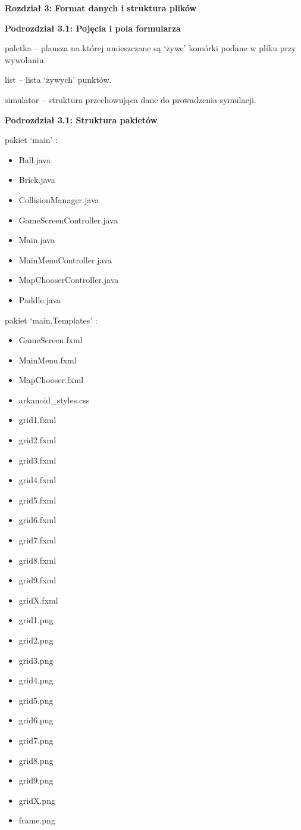 \documentclass[a4paper]{article}
\begin{document}
\bigskip
\textbf{Rozdzia{\l} 3: Format danych i struktura plików}

\bigskip
\textbf{Podrozdzia{\l} 3.1: Pojęcia i pola formularza}

paletka -- plansza na której umieszczane są `\.zywe' komórki podane w pliku przy wywo{\l}aniu.

list -- lista `\.zywych' punktów.

simulator -- struktura przechowująca dane do prowadzenia symulacji.

\bigskip
\textbf{Podrozdzia{\l} 3.1: Struktura pakietów}

\bigskip
pakiet ‘main’ :
\begin{itemize}
\item Ball.java
\item Brick.java
\item CollisionManager.java
\item GameScreenController.java
\item Main.java
\item MainMenuController.java
\item MapChooserController.java
\item Paddle.java
\end{itemize}

\bigskip
pakiet ‘main.Templates’ :
\begin{itemize}
\item GameScreen.fxml
\item MainMenu.fxml
\item MapChooser.fxml
\item arkanoid\_styles.css
\item grid1.fxml
\item grid2.fxml
\item grid3.fxml
\item grid4.fxml
\item grid5.fxml
\item grid6.fxml
\item grid7.fxml
\item grid8.fxml
\item grid9.fxml
\item gridX.fxml
\item grid1.png
\item grid2.png
\item grid3.png
\item grid4.png
\item grid5.png
\item grid6.png
\item grid7.png
\item grid8.png
\item grid9.png
\item gridX.png
\item frame.png
\end{itemize}
\end{document}
